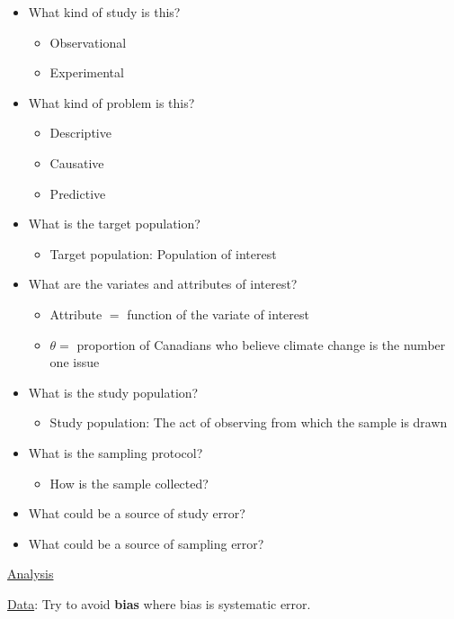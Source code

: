 \begin{itemize}
    \item What kind of study is this?
          \begin{itemize}
              \item Observational
              \item Experimental
          \end{itemize}
    \item What kind of problem is this?
          \begin{itemize}
              \item Descriptive
              \item Causative
              \item Predictive
          \end{itemize}
    \item What is the target population?
          \begin{itemize}
              \item Target population: Population of interest
          \end{itemize}
    \item What are the variates and attributes of interest?
          \begin{itemize}
              \item Attribute $ = $ function of the variate of interest
              \item $ \theta= $ proportion of Canadians who believe climate change is the number one issue
          \end{itemize}
    \item What is the study population?
          \begin{itemize}
              \item Study population: The act of observing from which the sample is drawn
          \end{itemize}
    \item What is the sampling protocol?
          \begin{itemize}
              \item How is the sample collected?
          \end{itemize}
    \item What could be a source of study error?
    \item What could be a source of sampling error?
\end{itemize}
\underline{Analysis}

\underline{Data}: Try to avoid \textbf{bias} where bias is systematic error.


